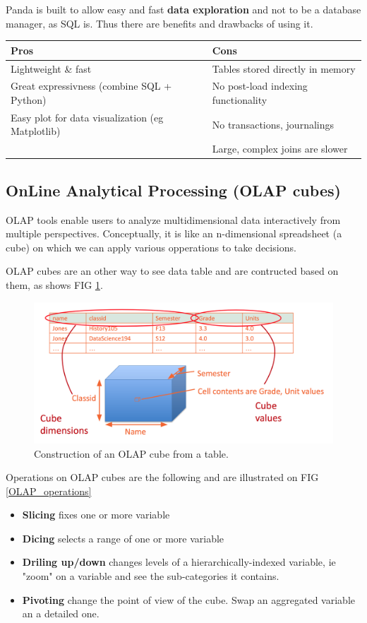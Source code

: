 \documentclass[a4paper,11pt,twoside]{article}
\begin{document}
Panda is built to allow easy and fast \textbf{data exploration} and not to be a database manager, as SQL is. Thus there are benefits and drawbacks of using it.


\begin{center} %
\begin{tabular} {| l | l |}
\hline
\bf Pros & \bf Cons \\ \hline
Lightweight \& fast & Tables stored directly in memory \\
Great expressivness (combine SQL + Python) & No post-load indexing functionality\\
Easy plot for data visualization (eg Matplotlib) & No transactions, journalings\\ 
& Large, complex joins are slower \\ \hline
\end{tabular}
\end{center}

\subsection{OnLine Analytical Processing (OLAP cubes)}

OLAP tools enable users to analyze multidimensional data interactively from multiple perspectives. Conceptually, it is like an n-dimensional spreadsheet (a cube) on which we can apply various opperations to take decisions.

OLAP cubes are an other way to see data table and are contructed based on them, as shows FIG \ref{OLAP_cubes}.

\begin{figure}[H]%
 \centering
 \includegraphics[width=12cm]{./pic/OLAP_cube}
 \caption{\label{OLAP_cubes} Construction of an OLAP cube from a table.}
\end{figure}

Operations on OLAP cubes are the following and are illustrated on FIG \ref{OLAP_operations}
\begin{itemize}
	\item \textbf{Slicing} fixes one or more variable
	\item \textbf{Dicing} selects a range of one or more variable
	\item \textbf{Driling up/down} changes levels of a hierarchically-indexed variable, ie "zoom" on a variable and see the sub-categories it contains.
	\item \textbf{Pivoting} change the point of view of the cube. Swap an aggregated variable an a detailed one.
\end{itemize}
\end{document}
